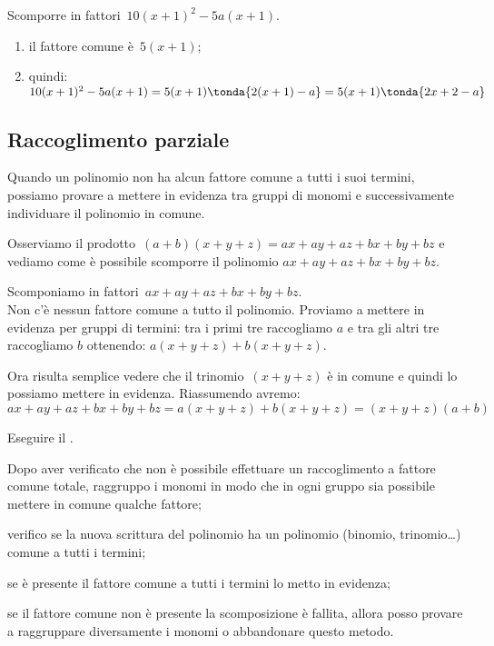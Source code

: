 \begin{esempio}{}{}
Scomporre in fattori~\(10(x+1)^{2}-5a(x+1)\).
\begin{enumerate} [left=0mm, noitemsep]
\item il fattore comune è~\(5(x+1)\);
\item quindi: \\ 
\(10(x+1)^{2}-5a(x+1)=5(x+1)\tonda{2(x+1)-a}=5(x+1)\tonda{2x+2-a}\)
\end{enumerate}
\end{esempio}


% 

\subsection{Raccoglimento parziale}
\label{subsec:divpol_raccoglimentoparziale}

Quando un polinomio non ha alcun fattore comune a tutti i suoi termini, 
possiamo provare a mettere in evidenza tra gruppi di monomi
e successivamente individuare il polinomio in comune.

Osserviamo il prodotto~\((a+b)(x+y+z)=ax+ay+az+bx+by+bz\) e
vediamo come è possibile scomporre il polinomio 
\(ax+ay+az+bx+by+bz\).

\begin{esempio}{}{}
Scomponiamo in fattori~\(ax+ay+az+bx+by+bz\). \\

Non c'è nessun fattore comune a tutto il polinomio.
Proviamo a mettere in evidenza per gruppi di termini: tra i primi tre 
raccogliamo \(a\) e tra gli altri tre raccogliamo \(b\) ottenendo:
\(a(x+y+z)+b(x+y+z)\). 

Ora risulta semplice vedere che il trinomio~\((x+y+z)\) è in comune e quindi 
lo possiamo mettere in evidenza. Riassumendo avremo:
\[ax+ay+az+bx+by+bz=a(x+y+z)+b(x+y+z)=(x+y+z)(a+b)\]
\end{esempio}

\begin{procedura}{}{}
Eseguire il .
\begin{enumeratea}
\item Dopo aver verificato che non è possibile effettuare un raccoglimento a 
fattore comune totale, raggruppo i monomi in modo che in ogni gruppo sia 
possibile mettere in comune qualche fattore;
\item verifico se la nuova scrittura del polinomio ha un polinomio 
(binomio, trinomio\ldots) comune a tutti i termini;
\item se è presente il fattore comune a tutti i termini lo metto in evidenza;
\item se il fattore comune non è presente la scomposizione è fallita, allora 
posso provare a raggruppare diversamente i monomi o abbandonare questo 
metodo.
\end{enumeratea}
\end{procedura}


